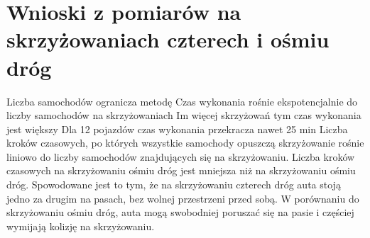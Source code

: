 \section{Wnioski z pomiarów na skrzyżowaniach czterech i ośmiu dróg}

Liczba samochodów ogranicza metodę
\newline
\newline
Czas wykonania rośnie ekspotencjalnie do liczby samochodów na skrzyżowaniach
\newline
\newline
Im więcej skrzyżowań tym czas wykonania jest większy
\newline
\newline
Dla 12 pojazdów czas wykonania przekracza nawet 25 min
\newline
\newline
Liczba kroków czasowych, po których wszystkie samochody opuszczą skrzyżowanie rośnie liniowo do liczby samochodów znajdujących się na skrzyżowaniu.
\newline
\newline
Liczba kroków czasowych na skrzyżowaniu ośmiu dróg jest mniejsza niż na skrzyżowaniu ośmiu dróg. Spowodowane jest to tym, że na skrzyżowaniu czterech dróg auta stoją jedno za drugim na pasach, bez wolnej przestrzeni przed sobą. W porównaniu do skrzyżowaniu ośmiu dróg, auta mogą swobodniej poruszać się na pasie i częściej wymijają kolizję na skrzyżowaniu.

